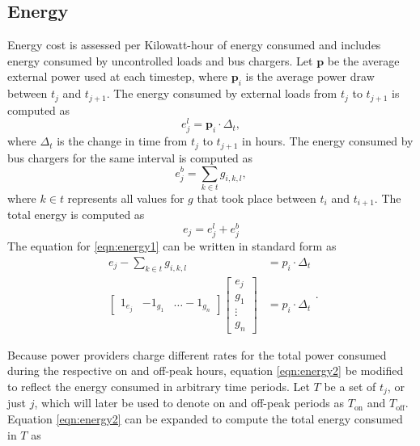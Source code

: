 \subsection{Energy}
\par Energy cost is assessed per Kilowatt-hour of energy consumed and includes energy consumed by uncontrolled loads and bus chargers. Let $\mathbf{p}$ be the average external power used at each timestep, where $\mathbf{p}_i$ is the average power draw between $t_j$ and $t_{j + 1}$. The energy consumed by external loads from $t_j$ to $t_{j+1}$ is computed as 
\begin{equation}
	e^l_j = \mathbf{p}_i \cdot \Delta_t,
\end{equation}
where $\Delta_t$ is the change in time from $t_j$ to $t_{j+1}$ in hours. The energy consumed by bus chargers for the same interval is computed as  
\begin{equation}
	e^b_j = \sum_{k\in t}g_{i,k,l},	
\end{equation}
where $k\in t$ represents all values for $g$ that took place between $t_i$ and $t_{i+1}$.
The total energy is computed as 
\begin{equation}\label{eqn:energy1}
	e_j = e^l_j + e^b_j
\end{equation}
The equation for \ref{eqn:energy1} can be written in standard form as 
\begin{equation}\label{eqn:energy2}
	\begin{aligned}
		e_j -\sum_{k\in t}g_{i,k,l} &= p_i \cdot \Delta_t \\
		\begin{bmatrix} 1_{e_j} & -1_{g_1} & \hdots -1_{g_n} \end{bmatrix} \begin{bmatrix}e_j \\ g_1 \\ \vdots \\ g_n \end{bmatrix} &= p_i \cdot \Delta_t
	\end{aligned}.
\end{equation}
\par Because power providers charge different rates for the total power consumed during the respective on and off-peak hours,  equation \ref{eqn:energy2} be modified to reflect the energy consumed in arbitrary time periods.  Let $T$ be a set of $t_j$, or just $j$, which will later be used to denote on and off-peak periods as $T_{\text{on}}$ and $T_{\text{off}}$. Equation \ref{eqn:energy2} can be expanded to compute the total energy consumed in $T$ as
